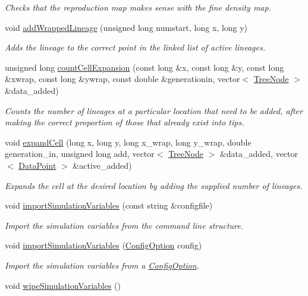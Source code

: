 \begin{DoxyCompactItemize}
\begin{DoxyCompactList}\small\item\em Checks that the reproduction map makes sense with the fine density map. \end{DoxyCompactList}\item 
void \hyperlink{class_spatial_tree_a5b26973b7f2dd3ca842a2eb8d2957896}{add\+Wrapped\+Lineage} (unsigned long numstart, long x, long y)
\begin{DoxyCompactList}\small\item\em Adds the lineage to the correct point in the linked list of active lineages. \end{DoxyCompactList}\item 
unsigned long \hyperlink{class_spatial_tree_a3e5e285241dbf1382e989624b1c77fed}{count\+Cell\+Expansion} (const long \&x, const long \&y, const long \&xwrap, const long \&ywrap, const double \&generationin, vector$<$ \hyperlink{class_tree_node}{Tree\+Node} $>$ \&data\+\_\+added)
\begin{DoxyCompactList}\small\item\em Counts the number of lineages at a particular location that need to be added, after making the correct proportion of those that already exist into tips. \end{DoxyCompactList}\item 
void \hyperlink{class_spatial_tree_a5a6cf10d4f6d84d06091b07399a7abc7}{expand\+Cell} (long x, long y, long x\+\_\+wrap, long y\+\_\+wrap, double generation\+\_\+in, unsigned long add, vector$<$ \hyperlink{class_tree_node}{Tree\+Node} $>$ \&data\+\_\+added, vector$<$ \hyperlink{class_data_point}{Data\+Point} $>$ \&active\+\_\+added)
\begin{DoxyCompactList}\small\item\em Expands the cell at the desired location by adding the supplied number of lineages. \end{DoxyCompactList}\item 
void \hyperlink{class_tree_a455d87022772b309a5974ea5f0295139}{import\+Simulation\+Variables} (const string \&configfile)
\begin{DoxyCompactList}\small\item\em Import the simulation variables from the command line structure. \end{DoxyCompactList}\item 
void \hyperlink{class_tree_a029af5f2dc1e33b4eead8110090ac778}{import\+Simulation\+Variables} (\hyperlink{class_config_option}{Config\+Option} config)
\begin{DoxyCompactList}\small\item\em Import the simulation variables from a \hyperlink{class_config_option}{Config\+Option}. \end{DoxyCompactList}\item 
void \hyperlink{class_tree_aa31508ea6d5801c6dee17c035f393b60}{wipe\+Simulation\+Variables} ()\hypertarget{class_tree_aa31508ea6d5801c6dee17c035f393b60}{}\label{class_tree_aa31508ea6d5801c6dee17c035f393b60}


\end{DoxyCompactItemize}
